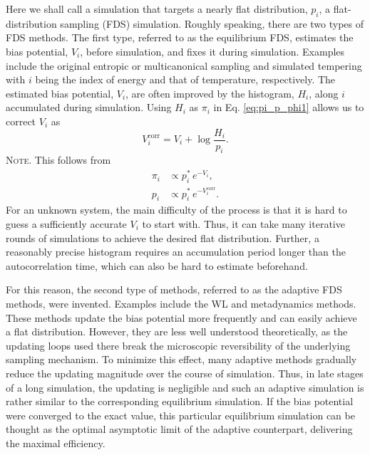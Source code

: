\documentclass[reprint, floatfix]{revtex4-1}
\newcommand{\note}[1]{{\color{DarkGreen}\footnotesize \textsc{Note.} #1}}
\begin{document}
Here we shall call a simulation that targets
a nearly flat distribution\cite{dayal2004, trebst2004, singh2011},
$p_i$,
a flat-distribution sampling (FDS) simulation.
%
Roughly speaking, there are two types of FDS methods.
%
The first type,
referred to as the equilibrium FDS, %
estimates the bias potential, $V_i$,
before simulation,
and fixes it during simulation.
%
Examples include the original
entropic or multicanonical sampling\cite{berg1992, lee1993}
and simulated tempering\cite{marinari1992, lyubartsev1992}
with $i$ being the index of energy
and that of temperature, respectively.
%
The estimated bias potential, $V_i$,
are often improved
by the histogram, $H_i$, along $i$ accumulated
during simulation.
%
Using $H_i$ as $\pi_i$ in
Eq. \eqref{eq:pi_p_phi1}
allows us to correct $V_i$ as
%
\begin{equation}
V^\mathrm{corr}_i
=
V_i
+
\log \frac{ H_i }
          { p_i }.
\label{eq:vcorr_equil}
\end{equation}
%
\note{This follows from
  $$
  \begin{aligned}
    \pi_i &\propto p^*_i \, e^{-V_i}, \\
    p_i &\propto p^*_i \, e^{-V^\mathrm{corr}_i}.
  \end{aligned}
  $$
}
For an unknown system,
the main difficulty of the process
is that it is hard to guess a sufficiently accurate
$V_i$ to start with.
%
Thus,
it can take many iterative rounds of simulations
to achieve the desired flat distribution.
%
Further, a reasonably precise histogram
requires an accumulation period
longer than the autocorrelation time,
which can also be hard to estimate beforehand.

For this reason, the second type of methods,
referred to as the adaptive FDS methods,
were invented.
%
Examples include
the WL and metadynamics methods.
%
These methods update the bias potential more frequently
and can easily achieve a flat distribution.
%
However, they are less well understood theoretically,
as the updating loops used there
break the microscopic reversibility
of the underlying sampling mechanism.
%
%
To minimize this effect,
many adaptive methods gradually
reduce the updating magnitude
over the course of simulation\cite{marsili2006,
liang2007,
belardinelli2007, belardinelli2007jcp, belardinelli2008}.
%
Thus, in late stages of a long simulation,
the updating is negligible and
such an adaptive simulation is rather similar
to the corresponding equilibrium simulation.
%
If the bias potential were converged to the exact value,
this particular equilibrium simulation can be thought as
the optimal asymptotic limit of the adaptive counterpart,
delivering the maximal efficiency.
\end{document}
